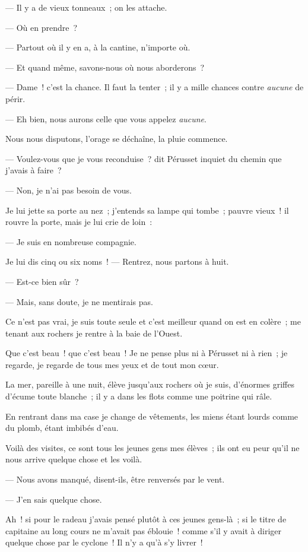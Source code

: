 \documentclass[french,twoside]{book} %
\begin{document}
— Il y a de vieux tonneaux ; on les attache.\par
 — Où en prendre ?\par
— Partout où il y en a, à la cantine, n’importe où.\par
— Et quand même, savons-nous où nous aborderons ?\par
— Dame ! c’est la chance. Il faut la tenter ; il y a mille chances contre \emph{aucune} de périr.\par
— Eh bien, nous aurons celle que vous appelez \emph{aucune}.\par
Nous nous disputons, l’orage se déchaîne, la pluie commence.\par
— Voulez-vous que je vous reconduise ? dit Pérusset inquiet du chemin que j’avais à faire ?\par
— Non, je n’ai pas besoin de vous.\par
Je lui jette sa porte au nez ; j’entends sa lampe qui tombe ; pauvre vieux ! il rouvre la porte, mais je lui crie de loin :\par
— Je suis en nombreuse compagnie.\par
Je lui dis cinq ou six noms ! — Rentrez, nous partons à huit.\par
— Est-ce bien sûr ?\par
— Mais, sans doute, je ne mentirais pas.\par
Ce n’est pas vrai, je suis toute seule et c’est meilleur quand on est en colère ; me tenant aux rochers je rentre à la baie de l’Ouest.\par
Que c’est beau ! que c’est beau ! Je ne pense plus ni à Pérusset ni à rien ; je regarde, je  regarde de tous mes yeux et de tout mon cœur.\par
La mer, pareille à une nuit, élève jusqu’aux rochers où je suis, d’énormes griffes d’écume toute blanche ; il y a dans les flots comme une poitrine qui râle.\par
En rentrant dans ma case je change de vêtements, les miens étant lourds comme du plomb, étant imbibés d’eau.\par
Voilà des visites, ce sont tous les jeunes gens mes élèves ; ils ont eu peur qu’il ne nous arrive quelque chose et les voilà.\par
— Nous avons manqué, disent-ils, être renversés par le vent.\par
— J’en sais quelque chose.\par
Ah ! si pour le radeau j’avais pensé plutôt à ces jeunes gens-là ; si le titre de capitaine au long cours ne m’avait pas éblouie ! comme s’il y avait à diriger quelque chose par le cyclone ! Il n’y a qu’à s’y livrer !\par
\end{document}
